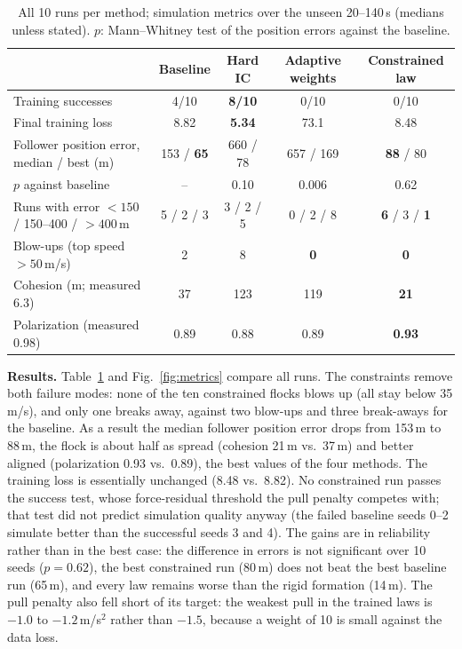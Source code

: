 \documentclass[10pt]{article}
\begin{document}
\begin{table}[t]
\centering\small
\caption{All 10 runs per method; simulation metrics over the unseen 20--140\,s (medians unless stated). $p$: Mann--Whitney test of the position errors against the baseline.}
\label{tab:results}
\begin{tabular}{lcccc}
\toprule
 & Baseline & Hard IC & Adaptive weights & Constrained law\\
\midrule
Training successes & 4/10 & \textbf{8/10} & 0/10 & 0/10\\
Final training loss & 8.82 & \textbf{5.34} & 73.1 & 8.48\\
Follower position error, median / best (m) & 153 / \textbf{65} & 660 / 78 & 657 / 169 & \textbf{88} / 80\\
$p$ against baseline & -- & 0.10 & 0.006 & 0.62\\
Runs with error $<150$ / 150--400 / $>400$\,m & 5 / 2 / 3 & 3 / 2 / 5 & 0 / 2 / 8 & \textbf{6} / 3 / \textbf{1}\\
Blow-ups (top speed $>50$\,m/s) & 2 & 8 & \textbf{0} & \textbf{0}\\
Cohesion (m; measured 6.3) & 37 & 123 & 119 & \textbf{21}\\
Polarization (measured 0.98) & 0.89 & 0.88 & 0.89 & \textbf{0.93}\\
\bottomrule
\end{tabular}
\end{table}

\textbf{Results.} Table~\ref{tab:results} and Fig.~\ref{fig:metrics} compare all runs.
The constraints remove both failure modes: none of the ten constrained flocks blows up (all stay below 35\,m/s), and only one breaks away, against two blow-ups and three break-aways for the baseline.
As a result the median follower position error drops from 153\,m to 88\,m, the flock is about half as spread (cohesion 21\,m vs.\ 37\,m) and better aligned (polarization 0.93 vs.\ 0.89), the best values of the four methods.
The training loss is essentially unchanged (8.48 vs.\ 8.82). No constrained run passes the success test, whose force-residual threshold the pull penalty competes with; that test did not predict simulation quality anyway (the failed baseline seeds 0--2 simulate better than the successful seeds 3 and 4).
The gains are in reliability rather than in the best case: the difference in errors is not significant over 10 seeds ($p=0.62$), the best constrained run (80\,m) does not beat the best baseline run (65\,m), and every law remains worse than the rigid formation (14\,m).
The pull penalty also fell short of its target: the weakest pull in the trained laws is $-1.0$ to $-1.2$\,m/s$^2$ rather than $-1.5$, because a weight of 10 is small against the data loss.
\end{document}
